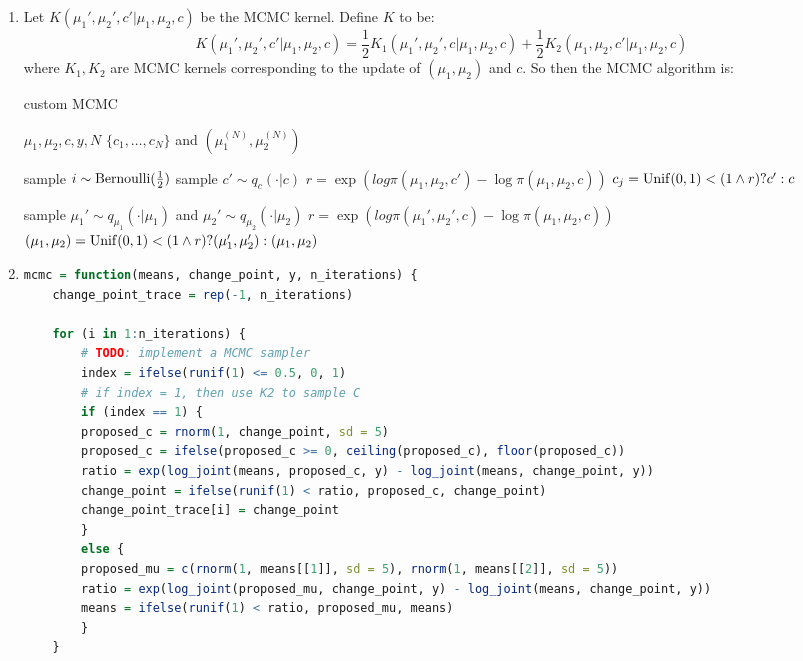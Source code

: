 \documentclass{article}
\begin{document}



\begin{enumerate}
\item 
Let $K(\mu_1', \mu_2', c' | \mu_1, \mu_2, c)$ be the MCMC kernel. Define $K$ to be:
\[K(\mu_1', \mu_2', c' | \mu_1, \mu_2, c) = \frac12 K_1(\mu_1', \mu_2', c | \mu_1, \mu_2, c) + \frac12 K_2(\mu_1, \mu_2, c' | \mu_1, \mu_2, c)\]where $K_1, K_2$ are MCMC kernels corresponding to the update of $(\mu_1, \mu_2)$ and $c$. So then the MCMC algorithm is:
\begin{algorithm}
    \caption{custom MCMC}
    \label{algo:mixture}
    \begin{algorithmic}[1]
        \Require $\mu_1, \mu_2, c, y, N$
        \Ensure $\{c_1, \ldots, c_N\}$ and $(\mu_1^{(N)}, \mu_2^{(N)})$

        \State sample $i \sim \operatorname{Bernoulli}(\frac12)$
        \State sample $c' \sim q_c( \cdot | c)$
        \State $r = \exp(log\pi(\mu_1, \mu_2, c') - \log\pi(\mu_1, \mu_2, c))$
        \State $c_j = \operatorname{Unif}(0,1) < (1 \wedge r) ? c' : c$

        \Else 
        \State sample $\mu_1' \sim q_{\mu_1}(\cdot | \mu_1)$ and $\mu_2' \sim q_{\mu_2}(\cdot | \mu_2)$
        \State $r = \exp(log\pi(\mu_1', \mu_2', c) - \log\pi(\mu_1, \mu_2, c))$
        \State $(\mu_1, \mu_2) = \operatorname{Unif}(0,1) < (1 \wedge r) ? (\mu_1', \mu_2') : (\mu_1, \mu_2)$

        \EndIf
        \EndFor
    \end{algorithmic}

\end{algorithm}



\item 
\begin{lstlisting}[language=R]
mcmc = function(means, change_point, y, n_iterations) {
    change_point_trace = rep(-1, n_iterations)
    
    for (i in 1:n_iterations) {
        # TODO: implement a MCMC sampler
        index = ifelse(runif(1) <= 0.5, 0, 1)
        # if index = 1, then use K2 to sample C
        if (index == 1) {
        proposed_c = rnorm(1, change_point, sd = 5)
        proposed_c = ifelse(proposed_c >= 0, ceiling(proposed_c), floor(proposed_c))
        ratio = exp(log_joint(means, proposed_c, y) - log_joint(means, change_point, y))
        change_point = ifelse(runif(1) < ratio, proposed_c, change_point)
        change_point_trace[i] = change_point
        }
        else {
        proposed_mu = c(rnorm(1, means[[1]], sd = 5), rnorm(1, means[[2]], sd = 5))
        ratio = exp(log_joint(proposed_mu, change_point, y) - log_joint(means, change_point, y))
        means = ifelse(runif(1) < ratio, proposed_mu, means)
        }
    }
    

\end{lstlisting}
\end{enumerate}
\end{document}
